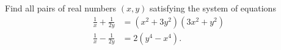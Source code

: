 Find all pairs of real numbers $(x,y)$ satisfying the system
of equations
\begin{align*}
 \frac{1}{x} + \frac{1}{2y} &= (x^2+3y^2)(3x^2+y^2) \\
   \frac{1}{x} - \frac{1}{2y} &= 2(y^4-x^4).
\end{align*}
